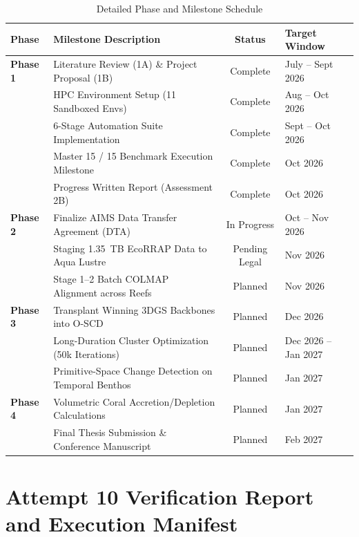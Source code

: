 \begin{table}[htbp]
\centering
\small
\caption{Detailed Phase and Milestone Schedule}
\label{tab:detailed_schedule}
\begin{tabularx}{\textwidth}{l p{5.5cm} c l}
\toprule
\textbf{Phase} & \textbf{Milestone Description} & \textbf{Status} & \textbf{Target Window} \\
\midrule
\textbf{Phase 1} & Literature Review (1A) \& Project Proposal (1B) & Complete & July -- Sept 2026 \\
& HPC Environment Setup (11 Sandboxed Envs) & Complete & Aug -- Oct 2026 \\
& 6-Stage Automation Suite Implementation & Complete & Sept -- Oct 2026 \\
& Master 15 / 15 Benchmark Execution Milestone & Complete & Oct 2026 \\
& Progress Written Report (Assessment 2B) & Complete & Oct 2026 \\
\midrule
\textbf{Phase 2} & Finalize AIMS Data Transfer Agreement (DTA) & In Progress & Oct -- Nov 2026 \\
& Staging 1.35~TB EcoRRAP Data to Aqua Lustre & Pending Legal & Nov 2026 \\
& Stage 1--2 Batch COLMAP Alignment across Reefs & Planned & Nov 2026 \\
\midrule
\textbf{Phase 3} & Transplant Winning 3DGS Backbones into O-SCD & Planned & Dec 2026 \\
& Long-Duration Cluster Optimization (50k Iterations) & Planned & Dec 2026 -- Jan 2027 \\
& Primitive-Space Change Detection on Temporal Benthos & Planned & Jan 2027 \\
\midrule
\textbf{Phase 4} & Volumetric Coral Accretion/Depletion Calculations & Planned & Jan 2027 \\
& Final Thesis Submission \& Conference Manuscript & Planned & Feb 2027 \\
\bottomrule
\end{tabularx}
\end{table}

\chapter{Attempt 10 Verification Report and Execution Manifest}
\label{app:verification}

